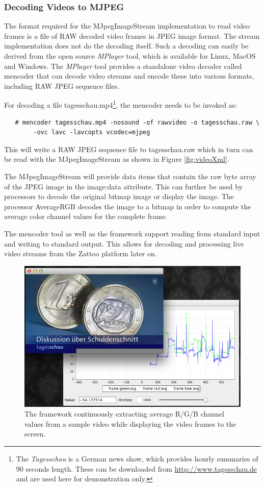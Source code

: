 \subsubsection*{Decoding Videos to MJPEG}
The format required for the {\ttfamily MJpegImageStream}
implementation to read video frames is a file of RAW decoded video
frames in JPEG image format. The stream implementation does not do the
decoding itself. Such a decoding can easily be derived from the open
source {\em MPlayer} tool, which is available for Linux, MacOS and
Windows. The {\em MPlayer} tool provides a standalone video decoder
called {\ttfamily mencoder} that can decode video streams and encode
these into various formats, including RAW JPEG sequence files.

For decoding a file {\ttfamily tagesschau.mp4}\footnote{The {\em
    Tagesschau} is a German news show, which provides hourly summaries
  of 90 seconds length. These can be downloaded from
  \url{http://www.tagesschau.de} and are used here for demonstration
  only.}, the {\ttfamily mencoder} needs to be invoked as:
\begin{verbatim}
   # mencoder tagesschau.mp4 -nosound -of rawvideo -o tagesschau.raw \
        -ovc lavc -lavcopts vcodec=mjpeg
\end{verbatim}
This will write a RAW JPEG sequence file to {\ttfamily tagesschau.raw}
which in turn can be read with the {\ttfamily MJpegImageStream} as shown
in Figure \ref{fig:videoXml}.

The {\ttfamily MJpegImageStream} will provide data items that contain
the raw byte array of the JPEG image in the {\ttfamily image:data}
attribute. This can further be used by processors to decode the original
bitmap image or display the image. The processor {\ttfamily AverageRGB}
decodes the image to a bitmap in order to compute the average color
channel values for the complete frame.

The {\ttfamily mencoder} tool as well as the \streams framework support
reading from standard input and writing to standard output. This allows
for decoding and processing live video streams from the Zattoo platform
later on.


\begin{figure}[h!]
  \centering
  \includegraphics[scale=0.3]{graphics/video-stream.png}
  \caption{\label{fig:videoStreaming}The \streams framework
    continuously extracting average R/G/B channel values from a sample
    video while displaying the video frames to the screen.}
\end{figure}
